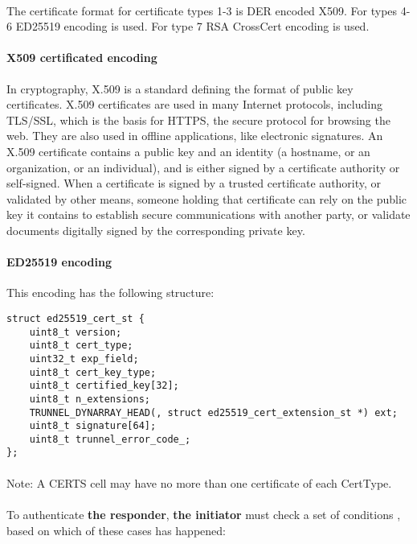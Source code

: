 \paragraph{}
The certificate format for certificate types 1-3 is DER encoded
X509. For types 4-6 ED25519 encoding is used. For type 7 RSA CrossCert
encoding is used.

\paragraph{X509 certificated encoding}

In cryptography, X.509 is a standard defining the format of public key certificates.
X.509 certificates are used in many Internet protocols, including TLS/SSL, which is
the basis for HTTPS, the secure protocol for browsing the web. They are also used
in offline applications, like electronic signatures. An X.509 certificate contains a
public key and an identity (a hostname, or an organization, or an individual), and
is either signed by a certificate authority or self-signed. When a certificate is
signed by a trusted certificate authority, or validated by other means, someone holding
that certificate can rely on the public key it contains to establish secure communications
with another party, or validate documents digitally signed by the corresponding private key.

\paragraph{ED25519 encoding}

This encoding has the following structure:

\begin{verbatim}
struct ed25519_cert_st {
    uint8_t version;
    uint8_t cert_type;
    uint32_t exp_field;
    uint8_t cert_key_type;
    uint8_t certified_key[32];
    uint8_t n_extensions;
    TRUNNEL_DYNARRAY_HEAD(, struct ed25519_cert_extension_st *) ext;
    uint8_t signature[64];
    uint8_t trunnel_error_code_;
};
\end{verbatim}

\paragraph{}
Note: A CERTS cell may have no more than one certificate of each CertType.

\paragraph{}
To authenticate \textbf{the responder}, \textbf{the initiator} must check a set of conditions ,
based on which of these cases has happened:

